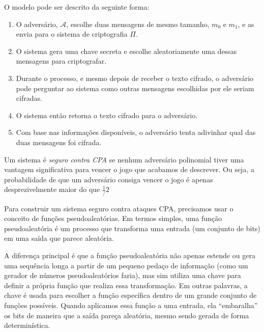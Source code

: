 O modelo pode ser descrito da seguinte forma:

\begin{enumerate}
    \item O adversário, $\mathcal{A}$, escolhe duas mensagens de mesmo tamanho, $m_0$ e $m_1$, e as envia para o sistema de criptografia $\Pi$.
    \item O sistema gera uma chave secreta e escolhe aleatoriamente uma dessas mensagens para criptografar.
    \item Durante o processo, e mesmo depois de receber o texto cifrado, o adversário pode perguntar ao sistema como outras mensagens escolhidas por ele seriam cifradas.
    \item O sistema então retorna o texto cifrado para o adversário.
    \item Com base nas informações disponíveis, o adversário tenta adivinhar qual das duas mensagens foi cifrada.
\end{enumerate}

\begin{center}
\end{center}

Um sistema é {\em seguro contra CPA} se nenhum adversário polinomial tiver uma vantagem significativa para vencer o jogo que acabamos de descrever.
Ou seja, a probabilidade de que um adversário consiga vencer o jogo é apenas desprezivelmente maior do que $\frac{1}/{2}$

Para construir um sistema seguro contra ataques CPA, precisamos usar o conceito de funções pseudoaleatórias.
Em termos simples, uma função pseudoaleatória é um processo que transforma uma entrada (um conjunto de bits) em uma saída que parece aleatória.

A diferença principal é que a função pseudoaleatória não apenas estende ou gera uma sequência longa a partir de um pequeno pedaço de informação (como um gerador de números pseudoaleatórios faria), mas sim utiliza uma chave para definir a própria função que realiza essa transformação.
Em outras palavras, a chave é usada para escolher a função específica dentro de um grande conjunto de funções possíveis.
Quando aplicamos essa função a uma entrada, ela ``embaralha'' os bits de maneira que a saída pareça aleatória, mesmo sendo gerada de forma determinística.

